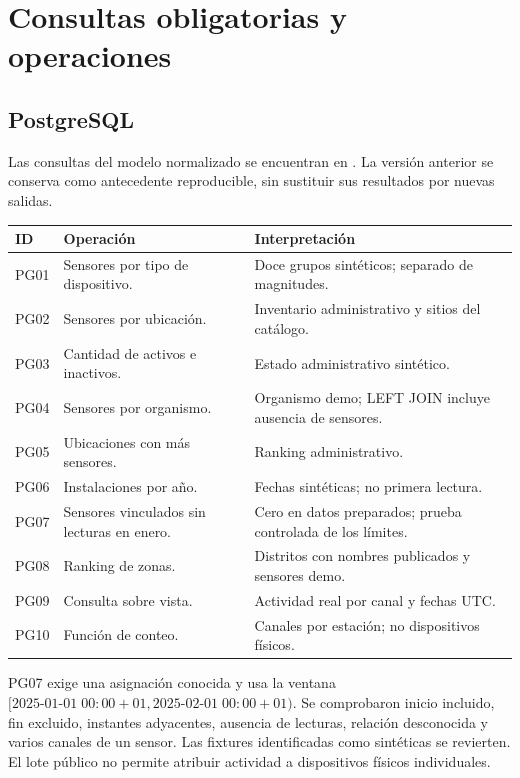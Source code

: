 \section{Consultas obligatorias y operaciones}
\subsection{PostgreSQL}
Las consultas del modelo normalizado se encuentran en
. La versión anterior se conserva
como antecedente reproducible, sin sustituir sus resultados por nuevas salidas.

\begin{longtable}{>{\raggedright\arraybackslash}p{}>{\raggedright\arraybackslash}p{}>{\raggedright\arraybackslash}p{}}
\toprule ID & Operación & Interpretación \\
\midrule\endhead
PG01 & Sensores por tipo de dispositivo. & Doce grupos sintéticos; separado de magnitudes. \\
PG02 & Sensores por ubicación. & Inventario administrativo y sitios del catálogo. \\
PG03 & Cantidad de activos e inactivos. & Estado administrativo sintético. \\
PG04 & Sensores por organismo. & Organismo demo; LEFT JOIN incluye ausencia de sensores. \\
PG05 & Ubicaciones con más sensores. & Ranking administrativo. \\
PG06 & Instalaciones por año. & Fechas sintéticas; no primera lectura. \\
PG07 & Sensores vinculados sin lecturas en enero. & Cero en datos preparados; prueba controlada de los límites. \\
PG08 & Ranking de zonas. & Distritos con nombres publicados y sensores demo. \\
PG09 & Consulta sobre vista. & Actividad real por canal y fechas UTC. \\
PG10 & Función de conteo. & Canales por estación; no dispositivos físicos. \\
\bottomrule
\end{longtable}

PG07 exige una asignación conocida y usa la ventana
$[2025\text{-}01\text{-}01\;00{:}00{+}01,
2025\text{-}02\text{-}01\;00{:}00{+}01)$.
Se comprobaron inicio incluido, fin excluido, instantes adyacentes, ausencia de
lecturas, relación desconocida y varios canales de un sensor. Las fixtures
identificadas como sintéticas se revierten. El lote público no permite atribuir
actividad a dispositivos físicos individuales.

